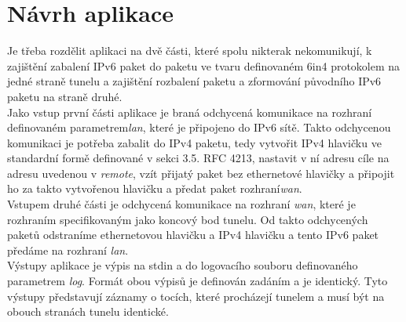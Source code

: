\documentclass[12pt,a4paper,onecolumn]{article}
\begin{document}
\section{Návrh aplikace}
Je třeba rozdělit aplikaci na dvě části, které spolu nikterak nekomunikují, k zajištění
zabalení IPv6 paket do paketu ve tvaru definovaném 6in4 protokolem na jedné straně tunelu a
zajištění rozbalení paketu a zformování původního IPv6 paketu na straně druhé.\\
\indent Jako vstup první části aplikace je braná odchycená komunikace na rozhraní definovaném
parametrem{\it lan}, které je připojeno do IPv6 sítě. Takto odchycenou komunikaci je potřeba
zabalit do IPv4 paketu, tedy vytvořit IPv4 hlavičku ve standardní formě definované v sekci 3.5.
RFC 4213, nastavit v ní adresu cíle na adresu uvedenou v {\it remote}, vzít přijatý paket bez
ethernetové hlavičky a připojit ho za takto vytvořenou hlavičku a předat paket
rozhraní{\it wan}.\\
\indent Vstupem druhé části je odchycená komunikace na rozhraní {\it wan}, které je rozhraním
specifikovaným jako koncový bod tunelu. Od takto odchycených paketů odstraníme ethernetovou
hlavičku a IPv4 hlavičku a tento IPv6 paket předáme na rozhraní {\it lan}.\\
\indent Výstupy aplikace je výpis na stdin a do logovacího souboru definovaného parametrem
{\it log}. Formát obou výpisů je definován zadáním a je identický. Tyto výstupy představují
záznamy o tocích, které procházejí tunelem a musí být na obouch stranách tunelu identické.
\end{document}
